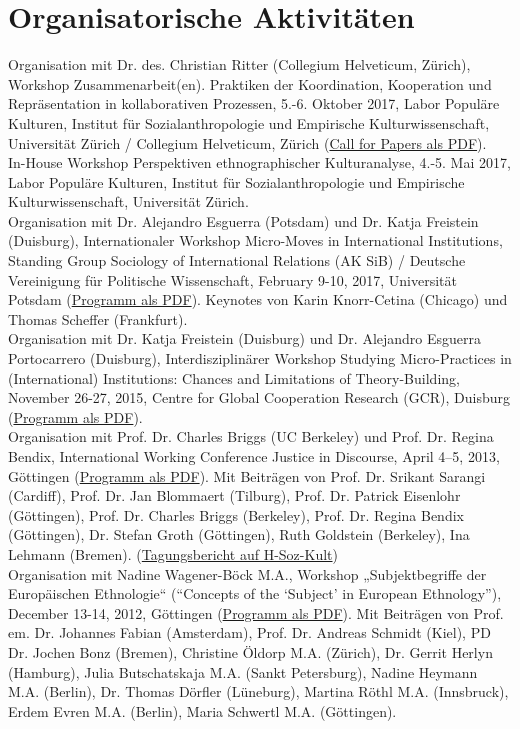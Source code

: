 \documentclass[11pt, a4paper]{article} %
\begin{document}
\section*{Organisatorische Aktivitäten}
    Organisation mit Dr. des. Christian Ritter (Collegium Helveticum, Zürich), Workshop Zusammenarbeit(en). Praktiken der Koordination, Kooperation und Repräsentation in kollaborativen Prozessen, 5.-6. Oktober 2017, Labor Populäre Kulturen, Institut für Sozialanthropologie und Empirische Kulturwissenschaft, Universität Zürich / Collegium Helveticum, Zürich (\href{http://www.stefangroth.com/assets/pdf/CfP_Zusammenarbeiten_Zürich.pdf}{Call for Papers als PDF}).\\[.25cm]
    In-House Workshop Perspektiven ethnographischer Kulturanalyse, 4.-5. Mai 2017, Labor Populäre Kulturen, Institut für Sozialanthropologie und Empirische Kulturwissenschaft, Universität Zürich.\\[.25cm]
    Organisation mit Dr. Alejandro Esguerra (Potsdam) und Dr. Katja Freistein (Duisburg), Internationaler Workshop Micro-Moves in International Institutions, Standing Group Sociology of International Relations (AK SiB) / Deutsche Vereinigung für Politische Wissenschaft, February 9-10, 2017, Universität Potsdam (\href{https://stefangroth.com/img/micromoves-program.pdf}{Programm als PDF}). Keynotes von Karin Knorr-Cetina (Chicago) und Thomas Scheffer (Frankfurt).\\[.25cm]
    Organisation mit Dr. Katja Freistein (Duisburg) und Dr. Alejandro Esguerra Portocarrero (Duisburg), Interdisziplinärer Workshop Studying Micro-Practices in (International) Institutions: Chances and Limitations of Theory-Building, November 26-27, 2015, Centre for Global Cooperation Research (GCR), Duisburg (\href{https://stefangroth.com/img/micro-programm.pdf}{Programm als PDF}).\\[.25cm]
    Organisation mit Prof. Dr. Charles Briggs (UC Berkeley) und Prof. Dr. Regina Bendix, International Working Conference Justice in Discourse, April 4–5, 2013, Göttingen (\href{https://stefangroth.com/img/justice-programm.pdf}{Programm als PDF}). Mit Beiträgen von Prof. Dr. Srikant Sarangi (Cardiff), Prof. Dr. Jan Blommaert (Tilburg), Prof. Dr. Patrick Eisenlohr (Göttingen), Prof. Dr. Charles Briggs (Berkeley), Prof. Dr. Regina Bendix (Göttingen), Dr. Stefan Groth (Göttingen), Ruth Goldstein (Berkeley), Ina Lehmann (Bremen). (\href{http://www.hsozkult.de/conferencereport/id/tagungsberichte-4961}{Tagungsbericht auf H-Soz-Kult})\\[.25cm]
    Organisation mit Nadine Wagener-Böck M.A., Workshop „Subjektbegriffe der Europäischen Ethnologie“ (“Concepts of the ‘Subject’ in European Ethnology”), December 13-14, 2012, Göttingen (\href{https://stefangroth.com/img/subjekt-programm.pdf}{Programm als PDF}). Mit Beiträgen von Prof. em. Dr. Johannes Fabian (Amsterdam), Prof. Dr. Andreas Schmidt (Kiel), PD Dr. Jochen Bonz (Bremen), Christine Öldorp M.A. (Zürich), Dr. Gerrit Herlyn (Hamburg), Julia Butschatskaja M.A. (Sankt Petersburg), Nadine Heymann M.A. (Berlin), Dr. Thomas Dörfler (Lüneburg), Martina Röthl M.A. (Innsbruck), Erdem Evren M.A. (Berlin), Maria Schwertl M.A. (Göttingen).
\end{document}
